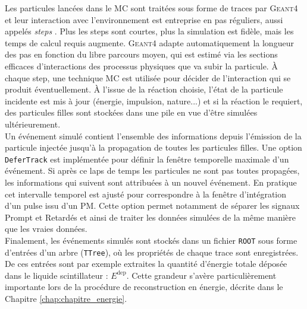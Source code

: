 Les particules lancées dans le MC sont traitées sous forme de traces par \textsc{Geant4} et leur interaction avec l'environnement est entreprise en pas réguliers, aussi appelés \og \textit{steps} \fg{}. Plus les steps sont courtes, plus la simulation est fidèle, mais les temps de calcul requis augmente. \textsc{Geant4} adapte automatiquement la longueur des pas en fonction du libre parcours moyen, qui est estimé via les sections efficaces d'interactions des processus physiques que va subir la particule. À chaque step, une technique MC est utilisée pour décider de l'interaction qui se produit éventuellement. À l'issue de la réaction choisie, l'état de la particule incidente est mis à jour (énergie, impulsion, nature...) et si la réaction le requiert, des particules filles sont stockées dans une pile en vue d'être simulées ultérieurement.\\

Un \og événement simulé \fg{} contient l'ensemble des informations depuis l'émission de la particule injectée jusqu'à la propagation de toutes les particules filles. Une option \texttt{DeferTrack} est implémentée pour définir la fenêtre temporelle maximale d'un événement. Si après ce laps de temps les particules ne sont pas toutes propagées, les informations qui suivent sont attribuées à un nouvel événement. En pratique cet intervalle temporel est ajusté pour correspondre à la fenêtre d'intégration d'un pulse issu d'un PM. Cette option permet notamment de séparer les signaux Prompt et Retardés et ainsi de traiter les données simulées de la même manière que les vraies données.\\

Finalement, les événements simulés sont stockés dans un fichier \texttt{ROOT} sous forme d'entrées d'un arbre (\texttt{TTree}), où les propriétés de chaque trace sont enregistrées. De ces entrées sont par exemple extraites la quantité d'énergie totale \og déposée \fg{} dans le liquide scintillateur : $E^\textrm{dep}$. Cette grandeur s'avère particulièrement importante lors de la procédure de reconstruction en énergie, décrite dans le Chapitre \ref{chap:chapitre_energie}.\\

\bigbreak



